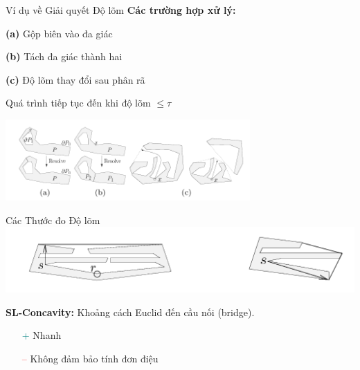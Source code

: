 \documentclass[aspectratio=169]{beamer}
\begin{document}
\begin{frame}{Ví dụ về Giải quyết Độ lõm}
    \vspace{0.5em}
    \textbf{Các trường hợp xử lý:}
    
    \textbf{(a)} Gộp biên vào đa giác

    \textbf{(b)} Tách đa giác thành hai

    \textbf{(c)} Độ lõm thay đổi sau phân rã

    \vspace{0.2cm}
    Quá trình tiếp tục đến khi độ lõm $\leq \tau$

     \centering
    \includegraphics[width=0.7\textwidth]{../imgs/ACD-3.png}
\end{frame}




\begin{frame}{Các Thước đo Độ lõm}
    \centering
    \includegraphics[width=0.8\linewidth]{../imgs/ACD-2.png}

    \vspace{0.5em}
    \textbf{SL-Concavity:} Khoảng cách Euclid đến cầu nối (bridge).
    \begin{itemize}
        \item[\textcolor{teal}{+}] Nhanh
        \item[\textcolor{red}{--}] Không đảm bảo tính đơn điệu
    \end{itemize}

\end{frame}
\end{document}
